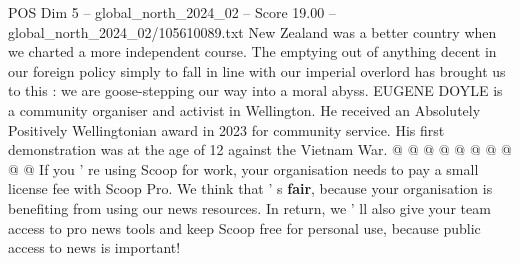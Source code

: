 \begin{textsample}{POS Dim 5 – global\_north\_2024\_02 – Score 19.00 – global\_north\_2024\_02/105610089.txt}
New Zealand was a better country when we charted a more independent course.
The emptying out of anything decent in our foreign policy simply to fall in line with our imperial overlord has brought us to this : we are goose-stepping our way into a moral abyss.
EUGENE DOYLE is a community organiser and activist in Wellington.
He received an Absolutely Positively Wellingtonian award in 2023 for community service.
His first demonstration was at the age of 12 against the Vietnam War. @ @ @ @ @ @ @ @ @ @ If you ' re using Scoop for work, your organisation needs to pay a small license fee with Scoop Pro.
We think that ' s \textbf{fair}, because your organisation is benefiting from using our news resources.
In return, we ' ll also give your team access to pro news tools and keep Scoop free for personal use, because public access to news is important!

\end{textsample}
